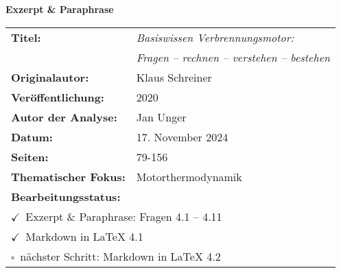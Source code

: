 \documentclass[a4paper,12pt]{article}
\newcommand{\checkbox}{$\square$}
\newcommand{\checkedbox}{$\checkmark$}
\begin{document}
\thispagestyle{empty}

\begin{center}
    {\huge\sffamily\bfseries Exzerpt \& Paraphrase\par}
    
    \vspace{2.5cm}
    
    \begin{tabular}{ll}
        \textbf{Titel:} & \textit{Basiswissen Verbrennungsmotor:} \\
        & \textit{Fragen -- rechnen -- verstehen -- bestehen} \\[0.5cm]
        \textbf{Originalautor:} & Klaus Schreiner \\[0.5cm]
        \textbf{Veröffentlichung:} & 2020 \\[0.5cm]
        \textbf{Autor der Analyse:} & Jan Unger \\[0.5cm]
        \textbf{Datum:} & 17. November 2024 \\[0.5cm]
        \textbf{Seiten:} & 79-156 \\[0.5cm]
        \textbf{Thematischer Fokus:} & Motorthermodynamik \\[0.5cm]
        \multicolumn{2}{l}{\textbf{Bearbeitungsstatus:}} \\[0.2cm]
        \multicolumn{2}{l}{\checkedbox~Exzerpt \& Paraphrase: Fragen 4.1 -- 4.11} \\
        \multicolumn{2}{l}{\checkedbox~Markdown in LaTeX 4.1} \\
        \multicolumn{2}{l}{\checkbox~nächster Schritt: Markdown in LaTeX 4.2}
    \end{tabular}
\end{center}

\newpage
\tableofcontents
\newpage



\printbibliography[
    title=Literaturverzeichnis,
    heading=bibintoc
]
\end{document}
